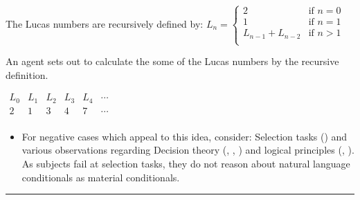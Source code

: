 \documentclass[10pt]{article}
\newcommand\sepLine{
  \vfill
  \par\noindent\rule{\textwidth}{0.4pt}
  \vfill}
\newcommand{\hand}{\ding{43}}
\begin{document}
\begin{note}
    \begin{scenario}%
    \label{scen:LucasNums}%
    The Lucas numbers are recursively defined by: \qquad
    \(
      L_{n} = \left\{
        \begin{array}{ll}
          2 & \text{if } n = 0 \\
          1 & \text{if } n = 1 \\
          L_{n-1} + L_{n-2} & \text{if } n > 1 \\
        \end{array}
      \right.
    \)

    \smallskip
    \noindent An agent sets out to calculate the some of the Lucas numbers by the recursive definition.
    \begin{center}
      \(
      \begin{array}{cccccc}
        L_{0} & L_{1} & L_{2} & L_{3} & L_{4} & \cdots \\
        \hline
        2 & 1 & 3 & 4 & 7 & \cdots \\
      \end{array}
      \)
    \end{center}
    \vspace{-2\baselineskip}
  \end{scenario}

  \begin{itemize}
  \item[\hand]
    For negative cases which appeal to this idea, consider:
    Selection tasks (\cite{Wason:1966aa}) and various observations regarding Decision theory (\cite{Allais:1979aa}, \cite{Ellsberg:1961aa}, \cite{Quinn:1990aa}) and logical principles (\cite{Makinson:1965aa}, \cite{Kyburg:1997aa}).\newline
    \mbox{}\hfill \leadsto As subjects fail at selection tasks, they do not reason about natural language conditionals as material conditionals.
  \end{itemize}
\end{note}

\sepLine
\end{document}
